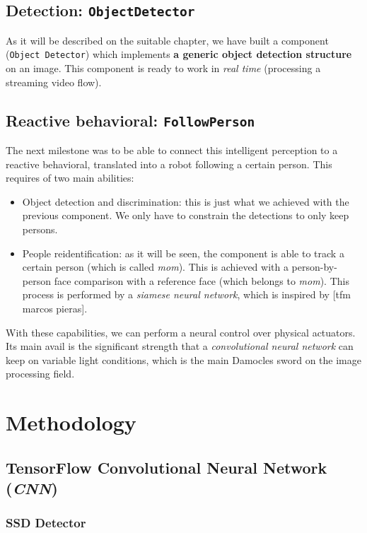 \subsection{Detection: \texttt{ObjectDetector}}
As it will be described on the suitable chapter, we have built a component (\texttt{Object Detector}) which implements \textbf{a generic object detection structure} on an image. This component is ready to work in \emph{real time} (processing a streaming video flow).\\

\subsection{Reactive behavioral: \texttt{FollowPerson}}

The next milestone was to be able to connect this intelligent perception to a reactive behavioral, translated into a robot following a certain person. This requires of two main abilities:
\begin{itemize}
	\item Object detection and discrimination: this is just what we achieved with the previous component. We only have to constrain the detections to only keep persons.
	\item People reidentification: as it will be seen, the component is able to track a certain person (which is called \emph{mom}). This is achieved with a person-by-person face comparison with a reference face (which belongs to \emph{mom}). This process is performed by a \emph{siamese neural network}, which is inspired by [tfm marcos pieras].
\end{itemize}

With these capabilities, we can perform a neural control over physical actuators. Its main avail is the significant strength that a \emph{convolutional neural network} can keep on variable light conditions, which is the main Damocles sword on the image processing field.

\section{Methodology}
\subsection{TensorFlow Convolutional Neural Network (\emph{CNN})}

\subsubsection{SSD Detector}
